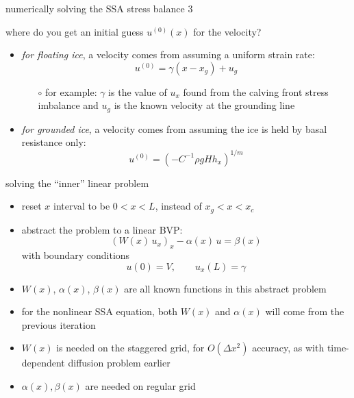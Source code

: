 \begin{frame}{numerically solving the SSA stress balance 3}

where do you get an initial guess $u^{(0)}(x)$ for the velocity?
\medskip

\begin{itemize}
\item \emph{for floating ice}, a velocity comes from assuming a uniform strain rate:
   $$u^{(0)} = \gamma (x-x_g) + u_g$$
  \begin{itemize}
  \item[$\circ$]  for example: $\gamma$ is the value of $u_x$ found from the calving front stress imbalance and $u_g$ is the known velocity at the grounding line
  \end{itemize}
\item \emph{for grounded ice}, a velocity comes from assuming the ice is held by basal resistance only:
   $$u^{(0)} = \left(-C^{-1} \rho g H h_x\right)^{1/m}$$
\end{itemize}
\end{frame}


\begin{frame}{solving the ``inner'' linear problem}
\begin{itemize}
\item reset $x$ interval to be $0 < x < L$, instead of $x_g < x < x_c$
\item abstract the problem to a linear BVP:
   $$\left(W(x)\, u_x\right)_x - \alpha(x)\, u = \beta(x)$$
with boundary conditions
   $$u(0) = V, \qquad  u_x(L) = \gamma$$
\item $W(x)$, $\alpha(x)$, $\beta(x)$ are all known functions in this abstract problem
\item for the nonlinear SSA equation, both $W(x)$ and $\alpha(x)$ will come from the previous iteration
\item $W(x)$ is needed on the staggered grid, for $O(\Delta x^2)$ accuracy, as with time-dependent diffusion problem earlier
\item $\alpha(x),\beta(x)$ are needed on regular grid
\end{itemize}
\end{frame}


